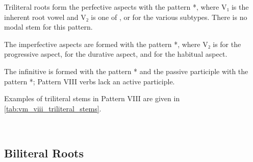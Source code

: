 \documentclass[grammar]{subfiles}
\begin{document}
Triliteral roots form the perfective aspects with the pattern *,
where V₁ is the inherent root vowel and V₂ is one of ,  or 
for the various subtypes.  There is no modal stem for this pattern. 

The imperfective aspects are formed with the pattern *, where
V₂ is  for the progressive aspect,  for the durative aspect, and
 for the habitual aspect.  

The infinitive is formed with the pattern * and the passive
participle with the pattern *; Pattern VIII verbs lack an active
participle.  

Examples of triliteral stems in Pattern VIII are given in \cref{tab:vm_viii_triliteral_stems}. 

\begin{table}[h!]\small\capstart
  \centering
  \\
  \caption{Pattern VIII triliteral stems \label{tab:vm_viii_triliteral_stems}}
\end{table}


\subsection{Biliteral Roots}
\label{ssec:vm_viii_biliteral_roots}
\end{document}

